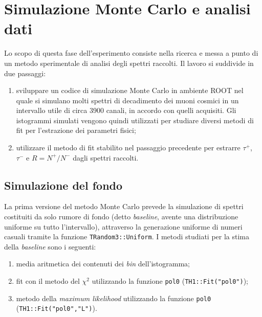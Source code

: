 \documentclass[10pt, oneside, a4paper]{article}   	%
\begin{document}
%
\cleardoublepage
\section{Simulazione Monte Carlo e analisi dati}
Lo scopo di questa fase dell'esperimento consiste nella ricerca e messa a punto di un metodo sperimentale di analisi degli spettri raccolti. Il lavoro si suddivide in due passaggi:
\begin{enumerate}
 \item sviluppare un codice di simulazione Monte Carlo in ambiente ROOT nel quale si simulano molti spettri di decadimento dei muoni cosmici in un intervallo utile di circa 3900 canali, in accordo con quelli acquisiti. Gli istogrammi simulati vengono quindi utilizzati per studiare diversi metodi di fit per l'estrazione dei parametri fisici;
 \item utilizzare il metodo di fit stabilito nel passaggio precedente per estrarre $\tau^+$, $\tau^-$ e $R=N^+/N^-$ dagli spettri raccolti.
\end{enumerate}
%
\subsection{Simulazione del fondo}
La prima versione del metodo Monte Carlo prevede la simulazione di spettri costituiti da solo rumore di fondo (detto \textit{baseline}, avente una distribuzione uniforme su tutto l'intervallo), attraverso la generazione uniforme di numeri casuali tramite la funzione \lstinline{TRandom3::Uniform}. I metodi studiati per la stima della \textit{baseline} sono i seguenti:
\begin{enumerate}
 \item media aritmetica dei contenuti dei \emph{bin} dell'istogramma;
 \item fit con il metodo del $\chi^2$ utilizzando la funzione \lstinline{pol0} (\lstinline{TH1::Fit("pol0")});
 \item metodo della \textit{maximum likelihood} utilizzando la funzione \lstinline{pol0} \newline (\lstinline{TH1::Fit("pol0","L")}).
\end{enumerate}
\end{document}
